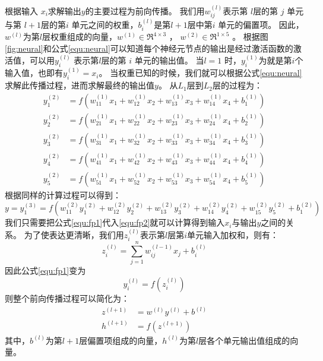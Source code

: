 根据输入 $x_i$求解输出$y$的主要过程为前向传播。
我们用$ w^{(l)}_{ij}$表示第 $ l $层的第 $ j$ 单元与第 $ l+1 $层的第$  i$ 单元之间的权重，$ b^{(l)}_i $是第$  l+1 $层中第$  i$ 单元的偏置项。
因此，$w^{(l)}$为第$l$层权重组成的向量，$ w^{(1)} \in \Re^{4\times 3}$ ， $ w^{(2)} \in \Re^{1\times 5}$ 。
根据图\ref{fig:neural}和公式\ref{equ:neural}可以知道每个神经元节点的输出是经过激活函数的激活值，可以用$ y^{(l)}_i$ 表示第$  l $层的第 $ i$ 单元的输出值。
当$  l=1$ 时，$  y^{(1)}_i$为就是第$  i $个输入值，也即有$  y^{(1)}_i = x_i $。
当权重已知的时候，我们就可以根据公式\ref{equ:neural}求解此传播过程，进而求解最终的输出值$y$。
从$L_1$层到$L_2$层的过程为：
\begin{align}
  y_1^{(2)} &= f(w_{11}^{(1)}x_1 + w_{12}^{(1)} x_2 + w_{13}^{(1)} x_3 + w_{14}^{(1)} x_4 + b_1^{(1)})  \\
  y_2^{(2)} &= f(w_{21}^{(1)}x_1 + w_{22}^{(1)} x_2 + w_{23}^{(1)} x_3 + w_{24}^{(1)} x_4 + b_2^{(1)})  \\
  y_3^{(2)} &= f(w_{31}^{(1)}x_1 + w_{32}^{(1)} x_2 + w_{33}^{(1)} x_3 + w_{34}^{(1)} x_4 + b_3^{(1)})  \\
  y_4^{(2)} &= f(w_{41}^{(1)}x_1 + w_{42}^{(1)} x_2 + w_{43}^{(1)} x_3 + w_{44}^{(1)} x_4 + b_4^{(1)})  \\
  y_5^{(2)} &= f(w_{51}^{(1)}x_1 + w_{52}^{(1)} x_2 + w_{53}^{(1)} x_3 + w_{54}^{(1)} x_4 + b_5^{(1)})
  \label{equ:fp1}
\end{align}
根据同样的计算过程可以得到：
\begin{equation}
  y = y_1^{(3)} =  f(w_{11}^{(2)} y_1^{(2)} + w_{12}^{(2)} y_2^{(2)} + w_{13}^{(2)} y_3^{(2)} + w_{14}^{(2)} y_4^{(2)} + w_{15}^{(2)} y_5^{(2)} + b_1^{(2)})
  \label{equ:fp2}
\end{equation}
我们只需要把公式\ref{equ:fp1}代入\ref{equ:fp2}就可以计算得到输入$x_i$与输出$y$之间的关系。
为了使表达更清晰，我们用$ z^{(l)}_i $表示第$ l $层第$  i$单元输入加权和，则有：
\begin{equation}
  z_i^{(l)} = \sum_{j=1}^n w^{(l-1)}_{ij} x_j + b^{(l)}_i
\end{equation}
因此公式\ref{equ:fp1}变为
\begin{equation}
  y^{(l)}_i = f(z^{(l)}_i)
\end{equation}
则整个前向传播过程可以简化为：
\begin{align}
  z^{(l+1)} &= w^{(l)} y^{(l)} + b^{(l)}   \\
  h^{(l+1)} &= f(z^{(l+1)})
\end{align}
其中，$b^{(l)}$为第$l+1$层偏置项组成的向量，$h^{(l)}$为第$l$层各个单元输出值组成的向量。

